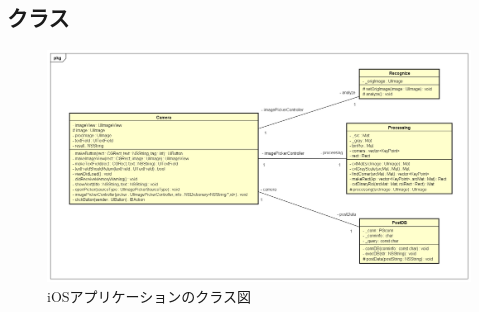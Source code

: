\subsection{クラス}
\begin{figure}
\begin{center}
\includegraphics[width=17cm]{fig/class_ios.png}
\end{center}
\caption{iOSアプリケーションのクラス図}
\end{figure}

